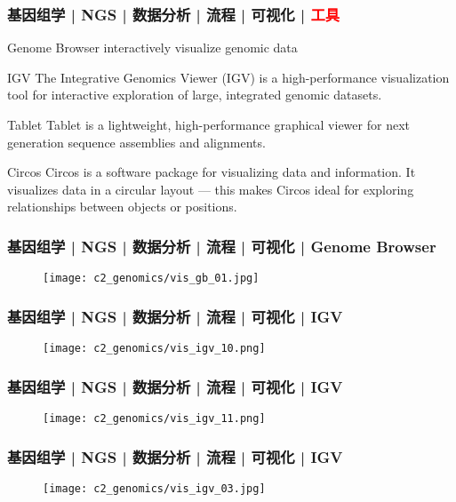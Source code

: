 \begin{frame}
  \frametitle{基因组学 | NGS | 数据分析 | 流程 | 可视化 | \textcolor{red}{工具}}
  \begin{block}{Genome Browser}
    interactively visualize genomic data
  \end{block}
  \pause
  \begin{block}{IGV}
    The Integrative Genomics Viewer (IGV) is a high-performance visualization tool for interactive exploration of large, integrated genomic datasets.
  \end{block}
  \pause
  \begin{block}{Tablet}
    Tablet is a lightweight, high-performance graphical viewer for next generation sequence assemblies and alignments.
  \end{block}
  \pause
  \begin{block}{Circos}
    Circos is a software package for visualizing data and information. It visualizes data in a circular layout --- this makes Circos ideal for exploring relationships between objects or positions.
  \end{block}
\end{frame}

\begin{frame}
  \frametitle{基因组学 | NGS | 数据分析 | 流程 | 可视化 | Genome Browser}
  \begin{figure}
    \centering
    \texttt{[image: c2\_genomics/vis\_gb\_01.jpg]}
  \end{figure}
\end{frame}

\begin{frame}
  \frametitle{基因组学 | NGS | 数据分析 | 流程 | 可视化 | IGV}
  \begin{figure}
    \centering
    \texttt{[image: c2\_genomics/vis\_igv\_10.png]}
  \end{figure}
\end{frame}

\begin{frame}
  \frametitle{基因组学 | NGS | 数据分析 | 流程 | 可视化 | IGV}
  \begin{figure}
    \centering
    \texttt{[image: c2\_genomics/vis\_igv\_11.png]}
  \end{figure}
\end{frame}

\begin{frame}
  \frametitle{基因组学 | NGS | 数据分析 | 流程 | 可视化 | IGV}
  \begin{figure}
    \centering
    \texttt{[image: c2\_genomics/vis\_igv\_03.jpg]}
  \end{figure}
\end{frame}

